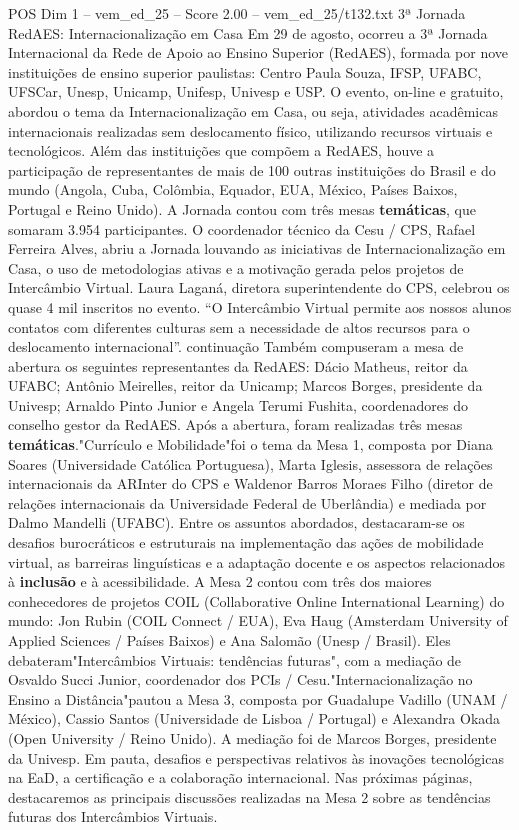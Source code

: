 \begin{textsample}{POS Dim 1 – vem\_ed\_25 – Score 2.00 – vem\_ed\_25/t132.txt}  \label{ex:f1_pos_004}
3ª Jornada RedAES: Internacionalização em Casa Em 29 de agosto, ocorreu a 3ª Jornada Internacional da Rede de Apoio ao Ensino Superior (RedAES), formada por nove instituições de ensino superior paulistas: Centro Paula Souza, IFSP, UFABC, UFSCar, Unesp, Unicamp, Unifesp, Univesp e USP.
O evento, on-line e gratuito, abordou o tema da Internacionalização em Casa, ou seja, atividades acadêmicas internacionais realizadas sem deslocamento físico, utilizando recursos virtuais e tecnológicos.
Além das instituições que compõem a RedAES, houve a participação de representantes de mais de 100 outras instituições do Brasil e do mundo (Angola, Cuba, Colômbia, Equador, EUA, México, Países Baixos, Portugal e Reino Unido).
A Jornada contou com três mesas \textbf{temáticas}, que somaram 3.954 participantes.
O coordenador técnico da Cesu / CPS, Rafael Ferreira Alves, abriu a Jornada louvando as iniciativas de Internacionalização em Casa, o uso de metodologias ativas e a motivação gerada pelos projetos de Intercâmbio Virtual.
Laura Laganá, diretora superintendente do CPS, celebrou os quase 4 mil inscritos no evento. “O Intercâmbio Virtual permite aos nossos alunos contatos com diferentes culturas sem a necessidade de altos recursos para o deslocamento internacional”. continuação Também compuseram a mesa de abertura os seguintes representantes da RedAES: Dácio Matheus, reitor da UFABC; Antônio Meirelles, reitor da Unicamp; Marcos Borges, presidente da Univesp; Arnaldo Pinto Junior e Angela Terumi Fushita, coordenadores do conselho gestor da RedAES.
Após a abertura, foram realizadas três mesas \textbf{temáticas}."Currículo e Mobilidade"foi o tema da Mesa 1, composta por Diana Soares (Universidade Católica Portuguesa), Marta Iglesis, assessora de relações internacionais da ARInter do CPS e Waldenor Barros Moraes Filho (diretor de relações internacionais da Universidade Federal de Uberlândia) e mediada por Dalmo Mandelli (UFABC).
Entre os assuntos abordados, destacaram-se os desafios burocráticos e estruturais na implementação das ações de mobilidade virtual, as barreiras linguísticas e a adaptação docente e os aspectos relacionados à \textbf{inclusão} e à acessibilidade.
A Mesa 2 contou com três dos maiores conhecedores de projetos COIL (Collaborative Online International Learning) do mundo: Jon Rubin (COIL Connect / EUA), Eva Haug (Amsterdam University of Applied Sciences / Países Baixos) e Ana Salomão (Unesp / Brasil).
Eles debateram"Intercâmbios Virtuais: tendências futuras", com a mediação de Osvaldo Succi Junior, coordenador dos PCIs / Cesu."Internacionalização no Ensino a Distância"pautou a Mesa 3, composta por Guadalupe Vadillo (UNAM / México), Cassio Santos (Universidade de Lisboa / Portugal) e Alexandra Okada (Open University / Reino Unido).
A mediação foi de Marcos Borges, presidente da Univesp.
Em pauta, desafios e perspectivas relativos às inovações tecnológicas na EaD, a certificação e a colaboração internacional.
Nas próximas páginas, destacaremos as principais discussões realizadas na Mesa 2 sobre as tendências futuras dos Intercâmbios Virtuais.

\end{textsample}
